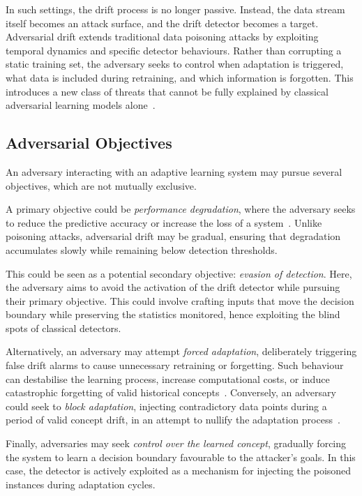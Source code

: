 In such settings, the drift process is no longer passive. Instead, the data stream itself becomes an attack surface, and the drift detector becomes a target. Adversarial drift extends traditional data poisoning attacks by exploiting temporal dynamics and specific detector behaviours. Rather than corrupting a static training set, the adversary seeks to control when adaptation is triggered, what data is included during retraining, and which information is forgotten. This introduces a new class of threats that cannot be fully explained by classical adversarial learning models alone~\cite{Kloft_2010}.

\subsection{Adversarial Objectives}
An adversary interacting with an adaptive learning system may pursue several objectives, which are not mutually exclusive.

A primary objective could be \emph{performance degradation}, where the adversary seeks to reduce the predictive accuracy or increase the loss of a system~\cite{Sethi_2018}. Unlike poisoning attacks, adversarial drift may be gradual, ensuring that degradation accumulates slowly while remaining below detection thresholds.

This could be seen as a potential secondary objective: \emph{evasion of detection}. Here, the adversary aims to avoid the activation of the drift detector while pursuing their primary objective. This could involve crafting inputs that move the decision boundary while preserving the statistics monitored, hence exploiting the blind spots of classical detectors.

Alternatively, an adversary may attempt \emph{forced adaptation}, deliberately triggering false drift alarms to cause unnecessary retraining or forgetting. Such behaviour can destabilise the learning process, increase computational costs, or induce catastrophic forgetting of valid historical concepts~\cite{Korycki_2022}. Conversely, an adversary could seek to \emph{block adaptation}, injecting contradictory data points during a period of valid concept drift, in an attempt to nullify the adaptation process~\cite{Korycki_2022}.

Finally, adversaries may seek \emph{control over the learned concept}, gradually forcing the system to learn a decision boundary favourable to the attacker’s goals. In this case, the detector is actively exploited as a mechanism for injecting the poisoned instances during adaptation cycles.

